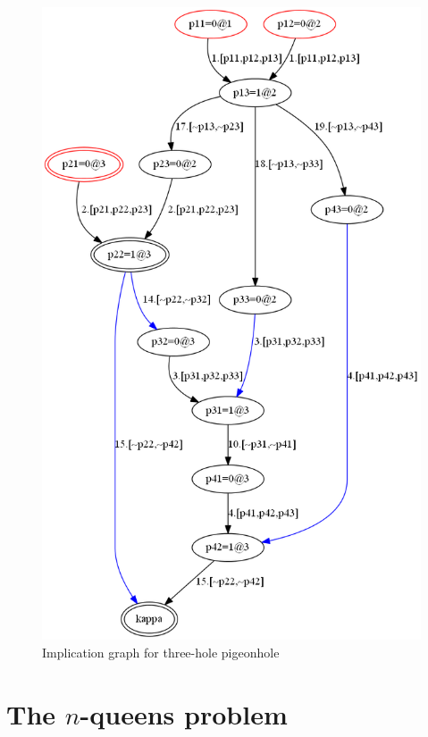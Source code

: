 \documentclass[11pt]{report}
\begin{document}
\begin{figure}
\begin{center}
\includegraphics[keepaspectratio=true,height=.9\textheight]{pigeon3-color}
\end{center}
\caption{Implication graph for three-hole pigeonhole}\label{pigeon3}
\end{figure}

\clearpage

\section{The $n$-queens problem}\label{ch.queens}
\end{document}

